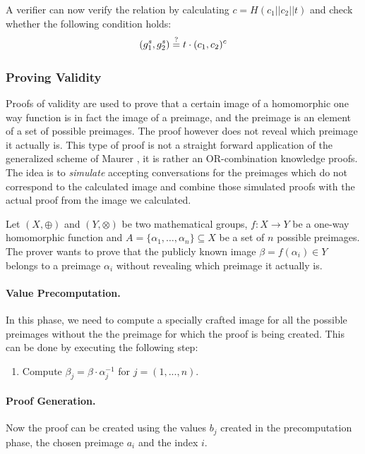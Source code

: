 \documentclass[numbers=noenddot, abstract=on, a4paper, headsepline,
footsepline, oneside, draft=off]{scrreprt}
\begin{document}
A verifier can now verify the relation by calculating
$c=H(c_1||c_2||t)$ and check whether the following condition holds:
\begin{equation}
	(g_1^s, g_2^s) \stackrel{?}{=} t \cdot (c_1, c_2)^c \notag
\end{equation}


\subsubsection{Proving Validity}
\label{sec:proofofvalidity}
Proofs of validity are used to prove that a certain image of a homomorphic one
way function is in fact the image of a preimage, and the preimage is an element
of a set of possible preimages. The proof however does not reveal which preimage
it actually is. This type of proof is not a straight forward application of the
generalized scheme of Maurer \cite{Maurer09}, it is rather an OR-combination
knowledge proofs. The idea is to \emph{simulate} accepting conversations for the
preimages which do not correspond to the calculated image and combine those
simulated proofs with the actual proof from the image we calculated. 

Let $(X,\oplus)$ and $(Y,\otimes)$ be two mathematical groups, $f:X \rightarrow
Y$ be a one-way homomorphic function and $A=\{\alpha_1,\ldots,\alpha_n\} \subseteq X$
be a set of $n$ possible preimages. The prover wants to prove that the publicly known
image $\beta=f(\alpha_i) \in Y$ belongs to a preimage $\alpha_i$ without
revealing which preimage it actually is. 

\paragraph{Value Precomputation.} In this phase, we need to compute a specially
crafted image for all the possible preimages without the the
preimage for which the proof is being created. This can be done by
executing the following step:

\begin{enumerate}
  \item Compute $\beta_j = \beta \cdot \alpha_j^{-1}$ for $j=(1,...,n)$.
\end{enumerate}
 
\paragraph{Proof Generation.} Now the proof can be created using the
values $b_j$ created in the precomputation phase, the chosen preimage $a_i$ and
the index $i$.
 
\end{document}
